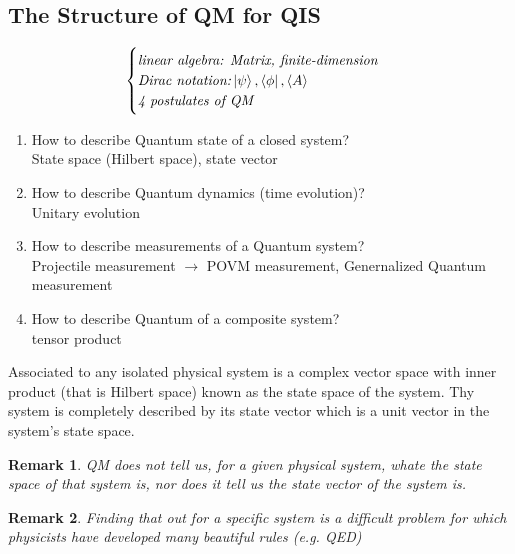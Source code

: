 \documentclass[]{article}
\newtheorem*{remark}{Remark}
\theoremstyle{nonumberplain}
\begin{document}
\subsection{The Structure of QM for QIS}%
\label{sec:the_structure_of_qm_for_qis}
\begin{equation*}
\begin{cases}
	\textit{linear algebra: Matrix, finite-dimension}\\
	\textit{Dirac notation:} \ket{\psi}, \bra{\phi}, \langle A \rangle\\
	\textit{4 postulates of QM}
\end{cases}
\end{equation*}
\begin{enumerate}
	\item How to describe Quantum state of a closed system? \\
		State space (Hilbert space), state vector
	\item How to describe Quantum dynamics (time evolution)? \\
		Unitary evolution
	\item How to describe measurements of a Quantum system? \\
		Projectile measurement $\rightarrow$ POVM measurement, Genernalized Quantum measurement
	\item How to describe Quantum of a composite system? \\
		tensor product
\end{enumerate}
\begin{postu}
	Associated to any isolated physical system is a complex vector space with inner product (that is Hilbert space) known as the state space of the system. Thy system is completely described by its state vector which is a unit vector in the system's state space.
\end{postu}
\begin{remark}
QM does not tell us, for a given physical system, whate the state space of that system is, nor does it tell us the state vector of the system is.
\end{remark}
\begin{remark}
	Finding that out for a specific system is a difficult problem for which physicists have developed many beautiful rules (e.g. QED)
\end{remark}
\end{document}
